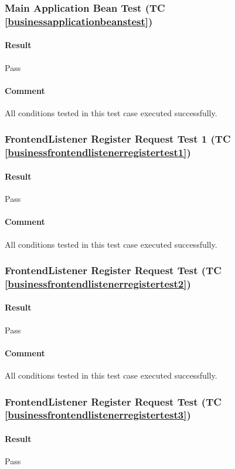 \documentclass[hidelinks,english]{article}
\begin{document}
			\subsubsection{Main Application Bean Test (TC \ref{businessapplicationbeanstest})}
				\paragraph{Result} Pass
				\paragraph{Comment} All conditions tested in this test case executed successfully.
				
			\subsubsection{FrontendListener Register Request Test 1 (TC \ref{businessfrontendlistenerregistertest1})}
				\paragraph{Result} Pass
				\paragraph{Comment} All conditions tested in this test case executed successfully.
				
			\subsubsection{FrontendListener Register Request Test (TC \ref{businessfrontendlistenerregistertest2})}
				\paragraph{Result} Pass
				\paragraph{Comment} All conditions tested in this test case executed successfully.
				
			\subsubsection{FrontendListener Register Request Test (TC \ref{businessfrontendlistenerregistertest3})}
				\paragraph{Result} Pass
\end{document}
